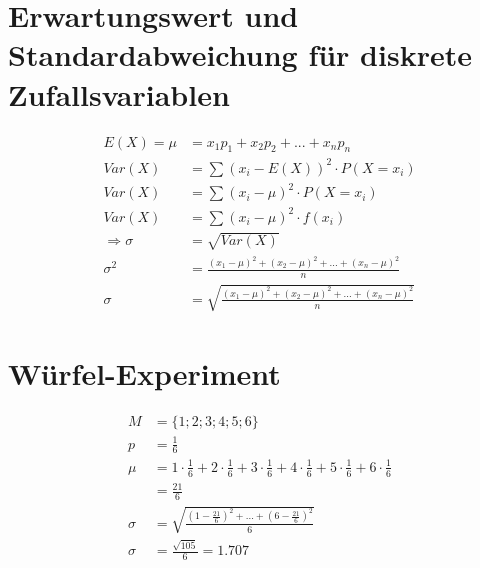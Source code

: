\documentclass[12pt,a4paper]{report}
\begin{document}
	\section{Erwartungswert und Standardabweichung für diskrete Zufallsvariablen}
	\begin{align*}
		E(X) = \mu &= x_1 p_1 + x_2 p_2 + ... + x_n p_n \\
		Var(X) &= \sum (x_i - E(X))^2 \cdot P(X = x_i) \\
		Var(X) &= \sum (x_i - \mu)^2 \cdot P(X = x_i) \\
		Var(X) &= \sum (x_i - \mu)^2 \cdot f(x_i) \\
		\Rightarrow \sigma &= \sqrt{Var(X)} \\
		\sigma^2 &= \frac{(x_1-\mu)^2 + (x_2-\mu)^2 + ... + (x_n-\mu)^2}{n} \\
		\sigma &= \sqrt{\frac{(x_1-\mu)^2 + (x_2-\mu)^2 + ... + (x_n-\mu)^2}{n}} 
	\end{align*}
	\section{Würfel-Experiment}
	\begin{align*}
		M &= \{1;2;3;4;5;6\} \\
		p &= \frac{1}{6} \\
		\mu &= 1\cdot \frac{1}{6} + 2\cdot \frac{1}{6} + 3\cdot \frac{1}{6} + 4\cdot \frac{1}{6} + 5\cdot \frac{1}{6} + 6\cdot \frac{1}{6} \\
		&= \frac{21}{6} \\
		\sigma &= \sqrt{\frac{(1-\frac{21}{6})^2 + ... +(6 - \frac{21}{6})^2}{6}} \\
		\sigma &= \frac{\sqrt{105}}{6} = 1.707
	\end{align*}
\end{document}
